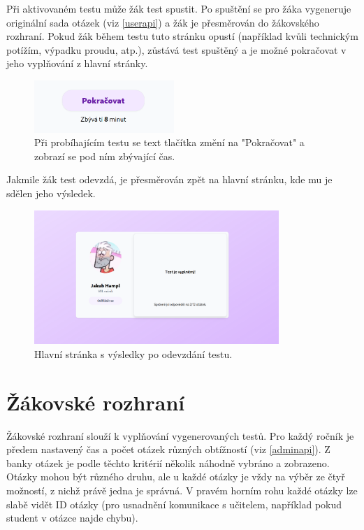 Při aktivovaném testu může žák test spustit. Po spuštění se pro žáka vygeneruje originální sada otázek (viz \ref{userapi}) a žák je přesměrován do žákovského rozhraní. Pokud žák během testu tuto stránku opustí (například kvůli technickým potížím, výpadku proudu, atp.), zůstává test spuštěný a je možné pokračovat v jeho vyplňování z hlavní stránky. 

\begin{figure}[H]
    \centering
    \includegraphics[width=200px]{images/01design/continue.png}
    \caption{Při probíhajícím testu se text tlačítka změní na "Pokračovat" a zobrazí se pod ním zbývající čas.}
\end{figure}

Jakmile žák test odevzdá, je přesměrován zpět na hlavní stránku, kde mu je sdělen jeho výsledek.

\begin{figure}[H]
    \centering
    \includegraphics[width=350px]{images/01design/filled-out.png}
    \caption{Hlavní stránka s výsledky po odevzdání testu.}
\end{figure}

\section{Žákovské rozhraní}

Žákovské rozhraní slouží k vyplňování vygenerovaných testů. Pro každý ročník je předem nastavený čas a počet otázek různých obtížností (viz \ref{adminapi}). Z banky otázek je podle těchto kritérií několik náhodně vybráno a zobrazeno. Otázky mohou být různého druhu, ale u každé otázky je vždy na výběr ze čtyř možností, z nichž právě jedna je správná. V pravém horním rohu každé otázky lze slabě vidět ID otázky (pro usnadnění komunikace s učitelem, například pokud student v otázce najde chybu).


